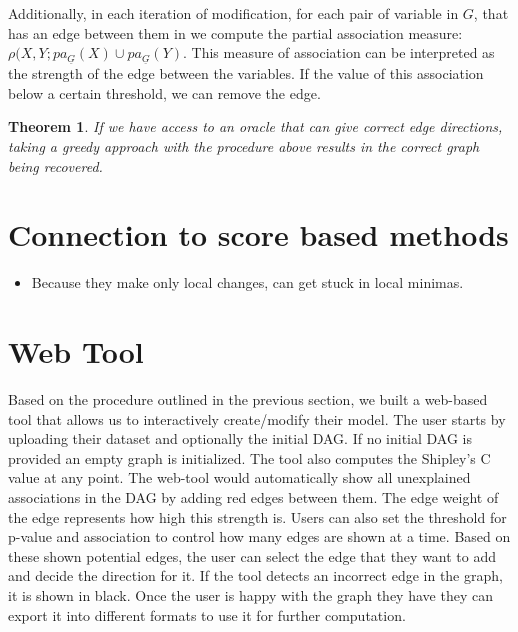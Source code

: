\documentclass[letterpaper]{article} %
\newtheorem{theorem}{Theorem}
\begin{document}
Additionally, in each iteration of modification, for each pair of variable in $
G $, that has an edge between them in we compute the partial association
measure: $ \rho(X, Y; pa_{\underline{G}}(X) \cup pa_{\underline{G}}(Y) $. This
measure of association can be interpreted as the strength of the edge between
the variables. If the value of this association below a certain threshold, we
can remove the edge.


\begin{theorem}
	If we have access to an oracle that can give correct edge directions, taking a
	greedy approach with the procedure above results in the correct graph
	being recovered. 
\end{theorem}

\section{Connection to score based methods}

\begin{itemize}
	\item Because they make only local changes, can get stuck in local minimas.
\end{itemize}

\section{Web Tool}
\label{sec:web}
Based on the procedure outlined in the previous section, we built a web-based
tool that allows us to interactively create/modify their model. The user
starts by uploading their dataset and optionally the initial DAG. If no initial
DAG is provided an empty graph is initialized. The tool also computes the
Shipley's C value at any point. The web-tool would automatically show all
unexplained associations in the DAG by adding red edges between them. The edge
weight of the edge represents how high this strength is. Users can also set the
threshold for p-value and association to control how many edges are shown at a
time. Based on these shown potential edges, the user can select the edge that
they want to add and decide the direction for it. If the tool detects an
incorrect edge in the graph, it is shown in black. Once the user is happy with
the graph they have they can export it into different formats to use it for
further computation.
\end{document}
